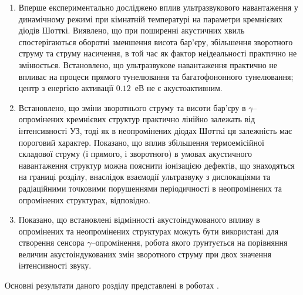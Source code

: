 \begin{enumerate}[leftmargin=0cm,itemindent=3em]
     \item Вперше експериментально досліджено вплив ультразвукового навантаження у динамічному режимі при кімнатній температурі на параметри кремнієвих діодів Шотткі.
        Виявлено, що при поширенні акустичних хвиль спостерігаються оборотні зменшення висота бар'єру,
збільшення зворотного струму та струму насичення, в той час як фактор неідеальності практично не змінюється.
Встановлено, що ультразвукове навантаження практично не впливає на процеси прямого тунелювання та багатофононного тунелювання;
     центр з енергією активації $0.12$~еВ не є акустоактивним.

\item Встановлено, що зміни зворотнього струму та висоти бар'єру в $\gamma$--опромінених кремнієвих структур практично лінійно залежать від інтенсивності УЗ,
    тоді як в неопромінених діодах Шотткі ця залежність має пороговий характер.
     Показано, що вплив збільшення термоемісійної складової струму (і прямого, і зворотного) в умовах акустичного навантаження структур можна пояснити іонізацією дефектів, що знаходяться на границі розділу,
  внаслідок взаємодії ультразвуку з дислокаціями та радіаційними точковими порушеннями періодичності в неопромінених та опромінених структурах, відповідно.

\item  Показано, що встановлені відмінності акустоіндукованого впливу в опромінених та неопромінених структурах можуть бути використані
для створення сенсора $\gamma$--опромінення, робота якого ґрунтується на порівняння величин акустоіндукованих змін зворотного струму при двох значення інтенсивності звуку.
  \end{enumerate}	

%

Основні результати даного розділу представлені в роботах \cite{Olikh:2013IEEE,Olikh:UPJ2013,Olikh:FTP2013,Olikh:SEMT2013,
Olikh:Ultras,7Drog,5UNCPS,2012Ternop,14Plivk,6UNCPS,2014IUS}.
